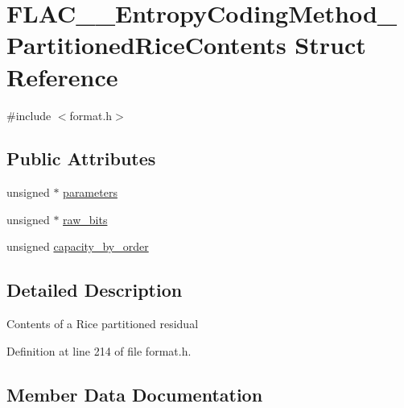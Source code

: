 \hypertarget{struct_f_l_a_c_____entropy_coding_method___partitioned_rice_contents}{}\section{F\+L\+A\+C\+\_\+\+\_\+\+Entropy\+Coding\+Method\+\_\+\+Partitioned\+Rice\+Contents Struct Reference}
\label{struct_f_l_a_c_____entropy_coding_method___partitioned_rice_contents}


{\ttfamily \#include $<$format.\+h$>$}

\subsection*{Public Attributes}
\begin{DoxyCompactItemize}
\item 
unsigned $\ast$ \mbox{\hyperlink{struct_f_l_a_c_____entropy_coding_method___partitioned_rice_contents_a06e97d40923f195410a65da9311ab6a2}{parameters}}
\item 
unsigned $\ast$ \mbox{\hyperlink{struct_f_l_a_c_____entropy_coding_method___partitioned_rice_contents_a915eb5369d39924bc29c948c29834279}{raw\+\_\+bits}}
\item 
unsigned \mbox{\hyperlink{struct_f_l_a_c_____entropy_coding_method___partitioned_rice_contents_abb60aca8d98bf9299558f230dfe83bc1}{capacity\+\_\+by\+\_\+order}}
\end{DoxyCompactItemize}


\subsection{Detailed Description}
Contents of a Rice partitioned residual 

Definition at line 214 of file format.\+h.



\subsection{Member Data Documentation}
\mbox{\label{struct_f_l_a_c_____entropy_coding_method___partitioned_rice_contents_abb60aca8d98bf9299558f230dfe83bc1}} 
